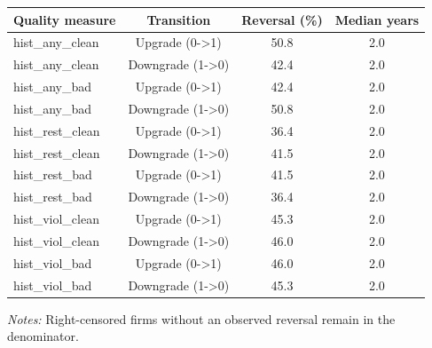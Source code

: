 \documentclass[10pt]{article}
\begin{document}
\begin{minipage}{19cm}\fontsize{10}{12}\selectfont\setlength{\tabcolsep}{4pt}\renewcommand{\arraystretch}{1.12}


\centering
{}
\begin{threeparttable}
\begin{tabular}{p{}ccc}
\toprule
Quality measure & Transition & Reversal (\%) & Median years \\
\midrule
hist\_any\_clean & Upgrade (0->1) & 50.8 & 2.0 \\
hist\_any\_clean & Downgrade (1->0) & 42.4 & 2.0 \\
hist\_any\_bad & Upgrade (0->1) & 42.4 & 2.0 \\
hist\_any\_bad & Downgrade (1->0) & 50.8 & 2.0 \\
hist\_rest\_clean & Upgrade (0->1) & 36.4 & 2.0 \\
hist\_rest\_clean & Downgrade (1->0) & 41.5 & 2.0 \\
hist\_rest\_bad & Upgrade (0->1) & 41.5 & 2.0 \\
hist\_rest\_bad & Downgrade (1->0) & 36.4 & 2.0 \\
hist\_viol\_clean & Upgrade (0->1) & 45.3 & 2.0 \\
hist\_viol\_clean & Downgrade (1->0) & 46.0 & 2.0 \\
hist\_viol\_bad & Upgrade (0->1) & 46.0 & 2.0 \\
hist\_viol\_bad & Downgrade (1->0) & 45.3 & 2.0 \\
\bottomrule
\end{tabular}
\begin{tablenotes}\fontsize{9}{11}\selectfont
\item \raggedright \fontsize{9}{11}\selectfont \textit{Notes:} Right-censored firms without an observed reversal remain in the denominator.
\end{tablenotes}
\end{threeparttable}

\end{minipage}
\end{document}

